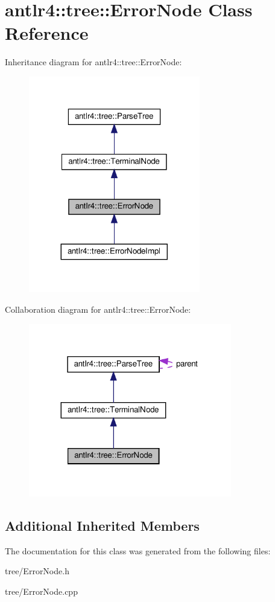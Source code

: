 \hypertarget{classantlr4_1_1tree_1_1ErrorNode}{}\section{antlr4\+:\+:tree\+:\+:Error\+Node Class Reference}
\label{classantlr4_1_1tree_1_1ErrorNode}


Inheritance diagram for antlr4\+:\+:tree\+:\+:Error\+Node\+:
\nopagebreak
\begin{figure}[H]
\begin{center}
\leavevmode
\includegraphics[width=212pt]{classantlr4_1_1tree_1_1ErrorNode__inherit__graph}
\end{center}
\end{figure}


Collaboration diagram for antlr4\+:\+:tree\+:\+:Error\+Node\+:
\nopagebreak
\begin{figure}[H]
\begin{center}
\leavevmode
\includegraphics[width=251pt]{classantlr4_1_1tree_1_1ErrorNode__coll__graph}
\end{center}
\end{figure}
\subsection*{Additional Inherited Members}


The documentation for this class was generated from the following files\+:\begin{DoxyCompactItemize}
\item 
tree/Error\+Node.\+h\item 
tree/Error\+Node.\+cpp\end{DoxyCompactItemize}
